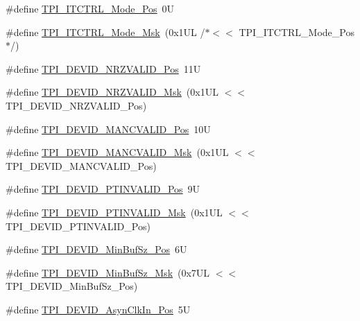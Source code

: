 \begin{DoxyCompactItemize}
\item 
\#define \hyperlink{group___c_m_s_i_s___t_p_i_gaa847adb71a1bc811d2e3190528f495f0}{T\+P\+I\+\_\+\+I\+T\+C\+T\+R\+L\+\_\+\+Mode\+\_\+\+Pos}~0U
\item 
\#define \hyperlink{group___c_m_s_i_s___t_p_i_gad6f87550b468ad0920d5f405bfd3f017}{T\+P\+I\+\_\+\+I\+T\+C\+T\+R\+L\+\_\+\+Mode\+\_\+\+Msk}~(0x1\+U\+L /$\ast$$<$$<$ T\+P\+I\+\_\+\+I\+T\+C\+T\+R\+L\+\_\+\+Mode\+\_\+\+Pos$\ast$/)
\item 
\#define \hyperlink{group___c_m_s_i_s___t_p_i_ga9f46cf1a1708575f56d6b827766277f4}{T\+P\+I\+\_\+\+D\+E\+V\+I\+D\+\_\+\+N\+R\+Z\+V\+A\+L\+I\+D\+\_\+\+Pos}~11U
\item 
\#define \hyperlink{group___c_m_s_i_s___t_p_i_gacecc8710a8f6a23a7d1d4f5674daf02a}{T\+P\+I\+\_\+\+D\+E\+V\+I\+D\+\_\+\+N\+R\+Z\+V\+A\+L\+I\+D\+\_\+\+Msk}~(0x1\+U\+L $<$$<$ T\+P\+I\+\_\+\+D\+E\+V\+I\+D\+\_\+\+N\+R\+Z\+V\+A\+L\+I\+D\+\_\+\+Pos)
\item 
\#define \hyperlink{group___c_m_s_i_s___t_p_i_ga675534579d9e25477bb38970e3ef973c}{T\+P\+I\+\_\+\+D\+E\+V\+I\+D\+\_\+\+M\+A\+N\+C\+V\+A\+L\+I\+D\+\_\+\+Pos}~10U
\item 
\#define \hyperlink{group___c_m_s_i_s___t_p_i_ga4c3ee4b1a34ad1960a6b2d6e7e0ff942}{T\+P\+I\+\_\+\+D\+E\+V\+I\+D\+\_\+\+M\+A\+N\+C\+V\+A\+L\+I\+D\+\_\+\+Msk}~(0x1\+U\+L $<$$<$ T\+P\+I\+\_\+\+D\+E\+V\+I\+D\+\_\+\+M\+A\+N\+C\+V\+A\+L\+I\+D\+\_\+\+Pos)
\item 
\#define \hyperlink{group___c_m_s_i_s___t_p_i_ga974cccf4c958b4a45cb71c7b5de39b7b}{T\+P\+I\+\_\+\+D\+E\+V\+I\+D\+\_\+\+P\+T\+I\+N\+V\+A\+L\+I\+D\+\_\+\+Pos}~9U
\item 
\#define \hyperlink{group___c_m_s_i_s___t_p_i_ga1ca84d62243e475836bba02516ba6b97}{T\+P\+I\+\_\+\+D\+E\+V\+I\+D\+\_\+\+P\+T\+I\+N\+V\+A\+L\+I\+D\+\_\+\+Msk}~(0x1\+U\+L $<$$<$ T\+P\+I\+\_\+\+D\+E\+V\+I\+D\+\_\+\+P\+T\+I\+N\+V\+A\+L\+I\+D\+\_\+\+Pos)
\item 
\#define \hyperlink{group___c_m_s_i_s___t_p_i_ga3f7da5de2a34be41a092e5eddd22ac4d}{T\+P\+I\+\_\+\+D\+E\+V\+I\+D\+\_\+\+Min\+Buf\+Sz\+\_\+\+Pos}~6U
\item 
\#define \hyperlink{group___c_m_s_i_s___t_p_i_ga939e068ff3f1a65b35187ab34a342cd8}{T\+P\+I\+\_\+\+D\+E\+V\+I\+D\+\_\+\+Min\+Buf\+Sz\+\_\+\+Msk}~(0x7\+U\+L $<$$<$ T\+P\+I\+\_\+\+D\+E\+V\+I\+D\+\_\+\+Min\+Buf\+Sz\+\_\+\+Pos)
\item 
\#define \hyperlink{group___c_m_s_i_s___t_p_i_gab382b1296b5efd057be606eb8f768df8}{T\+P\+I\+\_\+\+D\+E\+V\+I\+D\+\_\+\+Asyn\+Clk\+In\+\_\+\+Pos}~5U

\end{DoxyCompactItemize}
